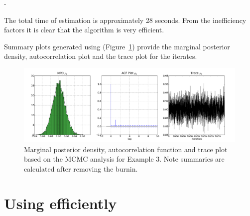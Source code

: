 -\documentclass[article]{jss}
\begin{document}
The total time of estimation is approximately 28 seconds. From the
inefficiency factors it is clear that the algorithm is very efficient.

Summary plots generated using 
(Figure~\ref{Flo:AR1}) provide the marginal posterior density,
autocorrelation plot and the trace plot for the iterates.


%
\begin{figure}[t!]
\begin{center}
  \includegraphics{rho.pdf}
\end{center}
\caption{Marginal posterior density, autocorrelation function and
  trace plot based on the MCMC analysis for Example 3. Note summaries
  are calculated after removing the burnin.}
\label{Flo:AR1}
\end{figure}


\section[Using PyMCMC  efficiently]{Using   efficiently}
\label{sec:Using-PyMCMC-efficiently}
\end{document}
